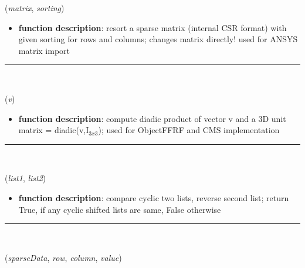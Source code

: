 \begin{itemize}[leftmargin=1.4cm]
\begin{itemize}[leftmargin=1.4cm]
\begin{itemize}[leftmargin=1.4cm]
\begin{itemize}[leftmargin=0.5cm]
\begin{itemize}[leftmargin=1.4cm]
\begin{itemize}[leftmargin=1.4cm]
\begin{itemize}[leftmargin=1.4cm]
\begin{itemize}[leftmargin=0.5cm]
\begin{flushleft}
({\it matrix}, {\it sorting})
\end{flushleft}
\setlength{\itemindent}{0.7cm}
\begin{itemize}[leftmargin=0.7cm]
\item[--]
{\bf function description}: resort a sparse matrix (internal CSR format) with given sorting for rows and columns; changes matrix directly! used for ANSYS matrix import
\vspace{12pt}\end{itemize}
%
\noindent\rule{8cm}{0.75pt}\vspace{1pt} \\ 
\begin{flushleft}
\label{sec:FEM:VectorDiadicUnitMatrix3D}
({\it v})
\end{flushleft}
\setlength{\itemindent}{0.7cm}
\begin{itemize}[leftmargin=0.7cm]
\item[--]
{\bf function description}: compute diadic product of vector v and a 3D unit matrix = diadic(v,I$_{3x3}$); used for ObjectFFRF and CMS implementation
\vspace{12pt}\end{itemize}
%
\noindent\rule{8cm}{0.75pt}\vspace{1pt} \\ 
\begin{flushleft}
\label{sec:FEM:CyclicCompareReversed}
({\it list1}, {\it list2})
\end{flushleft}
\setlength{\itemindent}{0.7cm}
\begin{itemize}[leftmargin=0.7cm]
\item[--]
{\bf function description}: compare cyclic two lists, reverse second list; return True, if any cyclic shifted lists are same, False otherwise
\vspace{12pt}\end{itemize}
%
\noindent\rule{8cm}{0.75pt}\vspace{1pt} \\ 
\begin{flushleft}
\label{sec:FEM:AddEntryToCompressedRowSparseArray}
({\it sparseData}, {\it row}, {\it column}, {\it value})

\end{flushleft}
\end{itemize}
\end{itemize}
\end{itemize}
\end{itemize}
\end{itemize}
\end{itemize}
\end{itemize}
\end{itemize}
